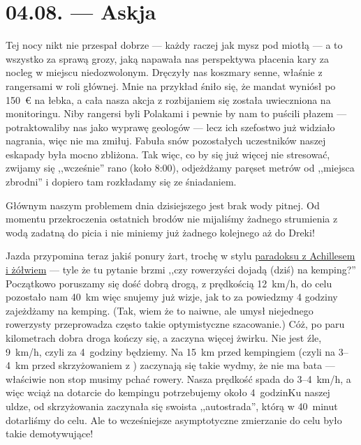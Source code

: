 \chapter*{04.08. --- Askja}

Tej nocy nikt nie przespał dobrze --- każdy raczej jak mysz pod miotłą --- a to wszystko za sprawą grozy, jaką napawała nas perspektywa płacenia kary za nocleg w miejscu niedozwolonym. Dręczyły nas koszmary senne, właśnie z rangersami w roli głównej. Mnie na przykład śniło się, że mandat wyniósł po 150~€ na łebka, a cała nasza akcja z rozbijaniem się została uwieczniona na monitoringu. Niby rangersi byli Polakami i pewnie by nam to puścili płazem --- potraktowaliby nas jako wyprawę geologów --- lecz ich szefostwo już widziało nagrania, więc nie ma zmiłuj. Fabuła snów pozostałych uczestników naszej eskapady była mocno zbliżona. Tak więc, co by się już więcej nie stresować, zwijamy się ,,wcześnie'' rano (koło 8:00), odjeżdżamy paręset metrów od ,,miejsca zbrodni'' i dopiero tam rozkładamy się ze śniadaniem.

Głównym naszym problemem dnia dzisiejszego jest brak wody pitnej. Od momentu przekroczenia ostatnich brodów nie mijaliśmy żadnego strumienia z wodą zadatną do picia i nie miniemy już żadnego kolejnego aż do Dreki!


Jazda przypomina teraz jakiś ponury żart, trochę w stylu \href{http://pl.wikipedia.org/wiki/Paradoksy_Zenona_z_Elei#Achilles_i_.C5.BC.C3.B3.C5.82w.5B2.5D}{paradoksu z Achillesem i żółwiem} --- tyle że tu pytanie brzmi ,,czy rowerzyści dojadą (dziś) na kemping?'' Początkowo poruszamy się dość dobrą drogą, z prędkością 12~km/h, do celu pozostało nam 40~km więc snujemy już wizje, jak to za powiedzmy 4 godziny zajeżdżamy na kemping. (Tak, wiem że to naiwne, ale umysł niejednego rowerzysty przeprowadza często takie optymistyczne szacowanie.) Cóż, po paru kilometrach dobra droga kończy się, a zaczyna więcej żwirku. Nie jest źle, 9~km/h, czyli za 4~godziny będziemy. Na 15~km przed kempingiem (czyli na \mbox{3--4~km} przed skrzyżowaniem z ) zaczynają się takie wydmy, że nie ma bata --- właściwie non stop musimy pchać rowery. Nasza prędkość spada do \mbox{3--4~km/h}, a więc wciąż na dotarcie do kempingu potrzebujemy około 4~godzin\textellipsis Ku naszej uldze, od skrzyżowania zaczynała się swoista ,,autostrada'', którą w 40~minut dotarliśmy do celu. Ale to wcześniejsze asymptotyczne zmierzanie do celu było takie demotywujące!


